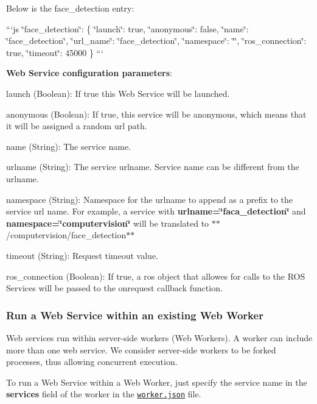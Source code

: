 Below is the face\-\_\-detection entry\-:

```js \char`\"{}face\-\_\-detection\char`\"{}\-: \{ \char`\"{}launch\char`\"{}\-: true, \char`\"{}anonymous\char`\"{}\-: false, \char`\"{}name\char`\"{}\-: \char`\"{}face\-\_\-detection\char`\"{}, \char`\"{}url\-\_\-name\char`\"{}\-: \char`\"{}face\-\_\-detection\char`\"{}, \char`\"{}namespace\char`\"{}\-: \char`\"{}\char`\"{}, \char`\"{}ros\-\_\-connection\char`\"{}\-: true, \char`\"{}timeout\char`\"{}\-: 45000 \} ```

{\bfseries Web Service configuration parameters}\-:


\begin{DoxyItemize}
\item {\ttfamily launch} (Boolean)\-: If true this Web Service will be launched.
\item {\ttfamily anonymous} (Boolean)\-: If true, this service will be anonymous, which means that it will be assigned a random url path.
\item {\ttfamily name} (String)\-: The service name.
\item {\ttfamily urlname} (String)\-: The service urlname. Service name can be different from the urlname.
\item {\ttfamily namespace} (String)\-: Namespace for the urlname to append as a prefix to the service url name. For example, a service with {\bfseries urlname=\char`\"{}faca\-\_\-detection\char`\"{}} and {\bfseries namespace=\char`\"{}computervision\char`\"{}} will be translated to $\ast$$\ast$/computervision/face\-\_\-detection$\ast$$\ast$
\item {\ttfamily timeout} (String)\-: Request timeout value.
\item {\ttfamily ros\-\_\-connection} (Boolean)\-: If true, a ros object that allowes for calls to the R\-O\-S Services will be passed to the onrequest callback function.
\end{DoxyItemize}

\subsubsection*{Run a Web Service within an existing Web Worker}

Web services run within server-\/side workers (Web Workers). A worker can include more than one web service. We consider server-\/side workers to be forked processes, thus allowing concurrent execution.

To run a Web Service within a Web Worker, just specify the service name in the {\bfseries services} field of the worker in the \href{https://github.com/rapp-project/rapp-platform/blob/master/rapp_web_services/config/services/workers.json}{\tt worker.\-json} file.

